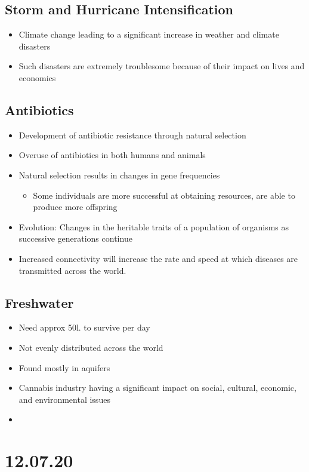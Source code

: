 \documentclass[11pt]{article}
\begin{document}
\subsection{Storm and Hurricane Intensification}
\label{sec:org39484ea}
\begin{itemize}
\item Climate change leading to a significant increase in weather and climate disasters
\item Such disasters are extremely troublesome because of their impact on lives and economics
\end{itemize}
\subsection{Antibiotics}
\label{sec:orgeb80ae2}
\begin{itemize}
\item Development of antibiotic resistance through natural selection
\item Overuse of antibiotics in both humans and animals
\item Natural selection results in changes in gene frequencies
\begin{itemize}
\item Some individuals are more successful at obtaining resources, are able to produce more offspring
\end{itemize}
\item Evolution: Changes in the heritable traits of a population of organisms as successive generations continue
\item Increased connectivity will increase the rate and speed at which diseases are transmitted across the world.
\end{itemize}
\subsection{Freshwater}
\label{sec:org8dabe5b}
\begin{itemize}
\item Need approx 50l. to survive per day
\item Not evenly distributed across the world
\item Found mostly in aquifers
\item Cannabis industry having a significant impact on social, cultural, economic, and environmental issues
\item 
\end{itemize}
\section{12.07.20}
\label{sec:org6900222}
\end{document}
